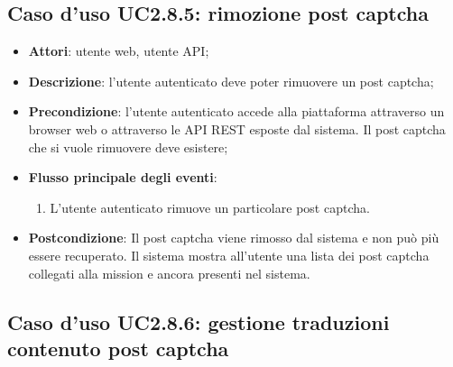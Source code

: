 \subsection{Caso d'uso UC2.8.5: rimozione post captcha}
\begin{itemize}
\item \textbf{Attori}: utente web, utente API;
\item \textbf{Descrizione}: l'utente autenticato deve poter rimuovere un post captcha; 
      \item \textbf{Precondizione}: l'utente autenticato accede alla piattaforma attraverso un browser web o attraverso le API REST esposte dal sistema. Il post captcha che si vuole rimuovere deve esistere;

        \item \textbf{Flusso principale degli eventi}:
          \begin{enumerate}
          \item L'utente autenticato rimuove un particolare post captcha.

      \end{enumerate}
    \item \textbf{Postcondizione}: Il post captcha viene rimosso dal sistema e non può più essere recuperato. Il sistema mostra all'utente una lista dei post captcha collegati alla mission e ancora presenti nel sistema.
  \end{itemize}
\hypertarget{UC2.8.6}{}
\subsection{Caso d'uso UC2.8.6: gestione traduzioni contenuto post captcha}

